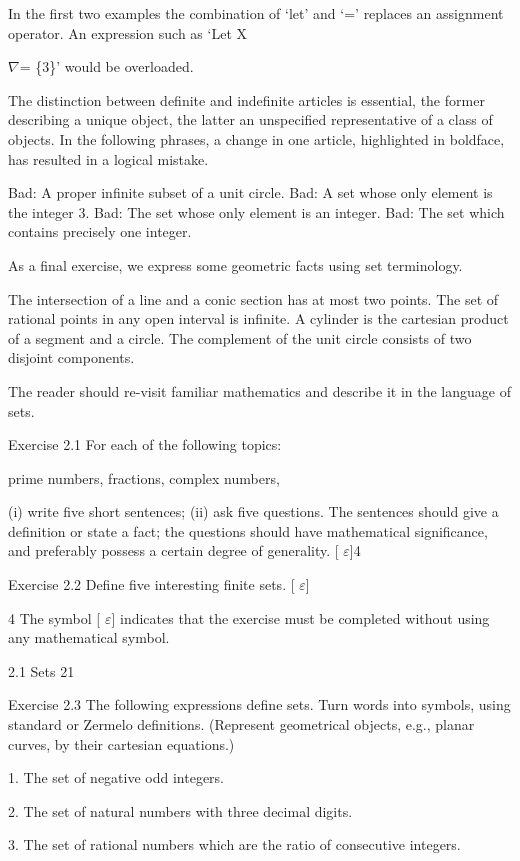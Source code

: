 \documentclass[11pt]{article}
\theoremstyle{plain}
\theoremstyle{definition}
\begin{document}
In the first two examples the combination of `let' and `=' replaces an assignment operator. An expression such as `Let X

$\nabla$= \{3\}' would be overloaded.

The distinction between definite and indefinite articles is essential, the former describing a unique object, the latter an unspecified representative of a class of objects. In the following phrases, a change in one article, highlighted in boldface, has resulted in a logical mistake.

Bad: A proper infinite subset of a unit circle. Bad: A set whose only element is the integer 3. Bad: The set whose only element is an integer. Bad: The set which contains precisely one integer.

As a final exercise, we express some geometric facts using set terminology.

The intersection of a line and a conic section has at most two points. The set of rational points in any open interval is infinite. A cylinder is the cartesian product of a segment and a circle. The complement of the unit circle consists of two disjoint components.

The reader should re-visit familiar mathematics and describe it in the language of sets.

Exercise 2.1 For each of the following topics:

prime numbers, fractions, complex numbers,

(i) write five short sentences; (ii) ask five questions. The sentences should give a definition or state a fact; the questions should have mathematical significance, and preferably possess a certain degree of generality. [ $\varepsilon$]4

Exercise 2.2 Define five interesting finite sets. [ $\varepsilon$]

4 The symbol [ $\varepsilon$] indicates that the exercise must be completed without using any mathematical symbol.

2.1 Sets 21

Exercise 2.3 The following expressions define sets. Turn words into symbols, using standard or Zermelo definitions. (Represent geometrical objects, e.g., planar curves, by their cartesian equations.)

1. The set of negative odd integers.

2. The set of natural numbers with three decimal digits.

3. The set of rational numbers which are the ratio of consecutive integers.
\end{document}
